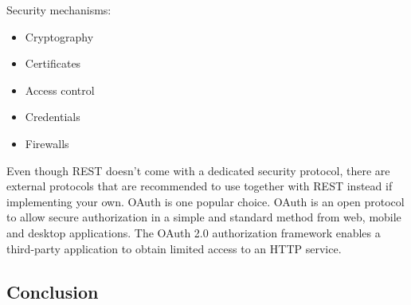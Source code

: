 Security mechanisms:
\begin{itemize}
	\item Cryptography
	\item Certificates
	\item Access control
	\item Credentials
	\item Firewalls
\end{itemize}


Even though REST doesn't come with a dedicated security protocol, there are external protocols that are recommended to use together with REST instead if implementing your own. OAuth is one popular choice. OAuth is an open protocol to allow secure authorization in a simple and standard method from web, mobile and desktop applications. The OAuth 2.0 authorization framework enables a third-party application to obtain limited access to an HTTP service.

\subsection*{Conclusion}


